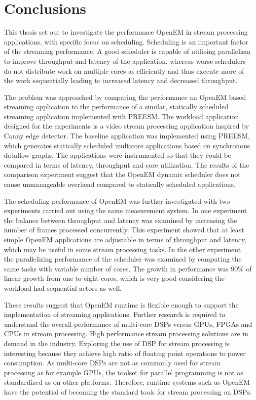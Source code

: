 \chapter{Conclusions}
\label{chapter:conclusion}
This thesis set out to investigate the performance OpenEM in stream processing applications, with specific focus on scheduling. Scheduling is an important factor of the streaming performance. A good scheduler is capable of utilising parallelism to improve throughput and latency of the application, whereas worse schedulers do not distribute work on multiple cores as efficiently and thus execute more of the work sequentially leading to increased latency and decreased throughput.

The problem was approached by comparing the performance an OpenEM based streaming application to the performance of a similar, statically scheduled streaming application implemented with PREESM. The workload application designed for the experiments is a video stream processing application inspired by Canny edge detector. The baseline application was implemented using PREESM, which generates statically scheduled multicore applications based on synchronous dataflow graphs. The applications were instrumented so that they could be compared in terms of latency, throughput and core utilization. The results of the comparison experiment suggest that the OpenEM dynamic scheduler does not cause unmanageable overhead compared to statically scheduled applications. 

The scheduling performance of OpenEM was further investigated with two experiments carried out using the same measurement system. In one experiment the balance between throughput and latency was examined by increasing the number of frames processed concurrently. This experiment showed that at least simple OpenEM applications are adjustable in terms of throughput and latency, which may be useful in some stream processing tasks. In the other experiment the parallelizing performance of the scheduler was examined by computing the same tasks with variable number of cores. The growth in performance was 90\% of linear growth from one to eight cores, which is very good considering the workload had sequential actors as well.

These results suggest that OpenEM runtime is flexible enough to support the implementation of streaming applications. Further research is required to understand the overall performance of multi-core DSPs versus GPUs, FPGAs and CPUs in stream processing. High performance stream processing solutions are in demand in the industry. Exploring the use of DSP for stream processing is interesting because they achieve high ratio of floating point operations to power consumption. As multi-core DSPs are not as commonly used for stream processing as for example GPUs, the toolset for parallel programming is not as standardized as on other platforms. Therefore, runtime systems such as OpenEM have the potential of becoming the standard tools for stream processing on DSPs.
